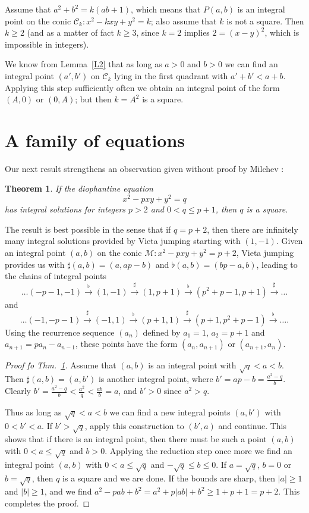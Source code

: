 \documentclass{amsart}
\newtheorem{theorem}[lemma]{Theorem}
\newcommand{\lra}{\longrightarrow}
\newcommand{\lrs}{\stackrel{\sharp}{\lra}}
\newcommand{\lrf}{\stackrel{\flat}{\lra}}
\newcommand{\cC}{{\mathcal C}}
\newcommand{\cM}{{\mathcal M}}
\begin{document}
Assume that $a^2 + b^2 = k(ab+1)$, which means that
$P(a, b)$ is an integral point on the conic $\cC_k: x^2 - kxy + y^2 = k$;
also assume that $k$ is not a square. Then $k \ge 2$ (and as a matter of
fact $k \ge 3$, since $k = 2$ implies $2 = (x-y)^2$, which is impossible
in integers).

We know from Lemma~\ref{L2} that as long as $a > 0$ and $b > 0$ we can find an
integral point $(a', b')$ on $\cC_k$ lying in the first quadrant with
$a' + b' < a + b$. Applying this step sufficiently often we obtain an
integral point of the form $(A,0)$ or $(0,A)$; but then $k = A^2$ is a
square.


\section{A family of equations}

Our next result strengthens an observation given without proof by
Milchev \cite{Milchev}:

\begin{theorem}\label{TM1}
  If the diophantine equation
  \begin{equation}\label{M1}
    x^2 - pxy + y^2 = q    
  \end{equation}
  has integral solutions for integers $p > 2$ and $0 < q \le p+1$, then
  $q$ is a square.
\end{theorem}

The result is best possible in the sense that if $q = p+2$, then there
are infinitely many integral solutions provided by Vieta jumping
starting with $(1,-1)$. Given an integral point $(a,b)$ on the conic
$\cM: x^2 - pxy + y^2 = p+2$, Vieta jumping provides us with
$\sharp(a,b) = (a,ap-b)$ and $\flat(a,b) = (bp-a,b)$, leading to the
chains of integral points
$$ \ldots (-p-1,-1) \lrf (1, -1) \lrs (1, p+1) \lrf (p^2+p-1,p+1) \lrs \ldots $$
and
$$ \ldots (-1,-p-1) \lrs (-1, 1) \lrf (p+1, 1) \lrs (p+1,p^2+p-1) \lrf \ldots.$$
Using the recurrence sequence $(a_n)$ defined by $a_1 = 1$,  $a_2 = p+1$
and $a_{n+1} = pa_n - a_{n-1}$, these points have the form $(a_n,a_{n+1})$ 
or  $(a_{n+1},a_n)$.

\begin{proof}[Proof fo Thm.~\ref{TM1}]
Assume that $(a,b)$ is an integral point with $\sqrt{q} < a < b$. Then
$\sharp(a,b) = (a,b')$ is another integral point, where
$b' = ap-b = \frac{a^2-q}{b}$. Clearly
$b' = \frac{a^2-q}{b} < \frac{a^2}q < \frac{ab}{b} = a$, and
$b' > 0$ since $a^2 > q$.

Thus as long as $\sqrt{q} < a < b$ we can find a new integral points
$(a,b')$ with $0 < b' < a$. If $b' > \sqrt{q}$, apply this construction
to $(b',a)$ and continue. This shows that if there is an integral point,
then there must be such a point $(a,b)$ with $0 < a \le \sqrt{q}$ and $b > 0$.
Applying the reduction step once more we find an integral point $(a,b)$
with $0 < a \le \sqrt{q}$ and $-\sqrt{q} \le b \le 0$. If $a = \sqrt{q}$,
$b = 0$ or $b = \sqrt{q}$, then $q$ is a square and we are done. If
the bounds are sharp, then $|a| \ge 1$ and $|b| \ge 1$, and we find
$ a^2 - pab + b^2 = a^2 + p|ab| + b^2 \ge 1 + p + 1 = p+2$. This
completes the proof.  
\end{proof}
\end{document}
